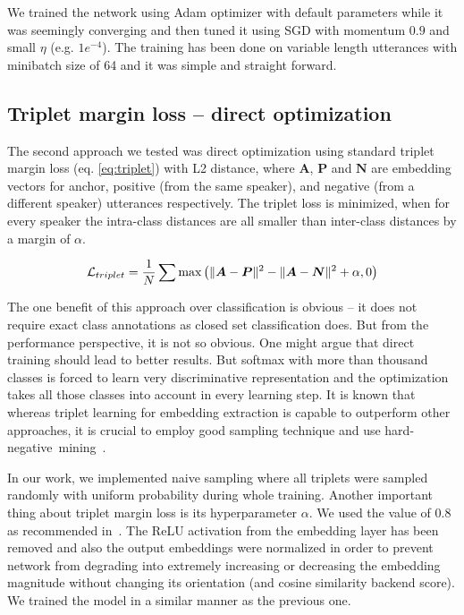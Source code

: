 \pagebreak
\noindent
We trained the network using Adam optimizer with default parameters while it was seemingly converging and then tuned it using SGD with momentum $ 0.9 $ and small $ \eta $ (e.g. $ 1e^{-4} $). The training has been done on variable length utterances with minibatch size of 64 and it was simple and straight forward.

\subsection*{Triplet margin loss -- direct optimization}

The second approach we tested was direct optimization using standard triplet margin loss (eq. \ref{eq:triplet}) with L2 distance, where $ \boldsymbol{A} $, $ \boldsymbol{P} $ and $ \boldsymbol{N} $ are embedding vectors for anchor, positive (from the same speaker), and negative (from a different speaker) utterances respectively. The triplet loss is minimized, when for every speaker the intra-class distances are all smaller than inter-class distances by a margin of $ \alpha $.

\begin{equation} \label{eq:triplet}
\mathcal{L}_{triplet} = \frac{1}{N} \sum \textnormal{max}
\left( 
\lVert\boldsymbol{A} - \boldsymbol{P}\rVert^2 - 
\lVert\boldsymbol{A} - \boldsymbol{N}\rVert^2 
+ \alpha, 0 \right)
\end{equation}

\noindent
The one benefit of this approach over classification is obvious -- it does not require exact class annotations as closed set classification does. But from the performance perspective, it is not so obvious. One might argue that direct training should lead to better results. But softmax with more than thousand classes is forced to learn very discriminative representation and the optimization takes all those classes into account in every learning step. It is known that whereas triplet learning for embedding extraction is capable to outperform other approaches, it is crucial to employ good sampling technique and use hard-negative~mining~\cite{YuanYZ16}.

\medskip
In our work, we implemented naive sampling where all triplets were sampled randomly with uniform probability during whole training. Another important thing about triplet margin loss is its hyperparameter $ \alpha $. We used the value of 0.8 as recommended in~\cite{x_vectors_triplet}. The ReLU activation from the embedding layer has been removed and also the output embeddings were normalized in order to prevent network from degrading into extremely increasing or decreasing the embedding magnitude without changing its orientation (and cosine similarity backend score). We trained the model in a similar manner as the previous one.

